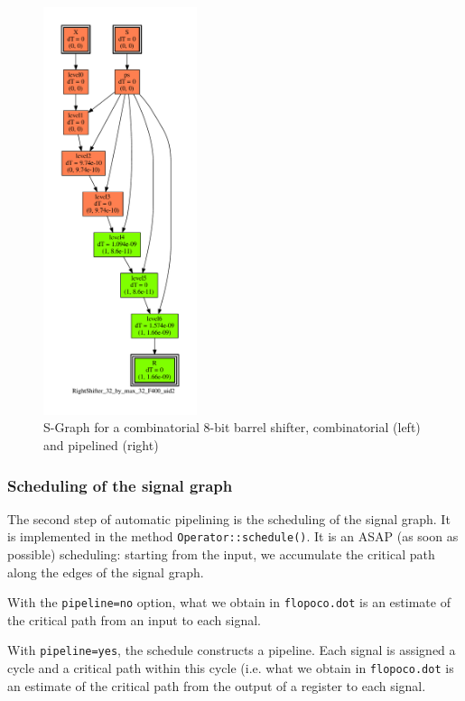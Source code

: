\documentclass{article}
\begin{document}
\begin{figure}
    \includegraphics[width=0.4\textwidth]{Fig/depgraphShifterPipelined}
		\centering
		\caption{S-Graph for a combinatorial 8-bit barrel shifter, combinatorial (left) and pipelined (right)}
		\label{fig:depgraphShifter}
	\end{figure}    


\subsubsection{Scheduling of the signal graph}\label{sec:scheduling}
The second step of automatic pipelining is the scheduling of the signal graph.
It is implemented in the method \texttt{Operator::schedule()}.
It is an ASAP (as soon as possible) scheduling: starting from the input, we accumulate the critical path along the edges of the signal graph.

With the \texttt{pipeline=no} option, what we obtain in \texttt{flopoco.dot} is an estimate of the critical path from an input to each signal.


With \texttt{pipeline=yes}, the schedule constructs a pipeline.
Each signal is assigned a cycle and a critical path within this cycle (i.e. what we obtain in \texttt{flopoco.dot} is an estimate of the critical path from the output of a register to each signal.
\end{document}
